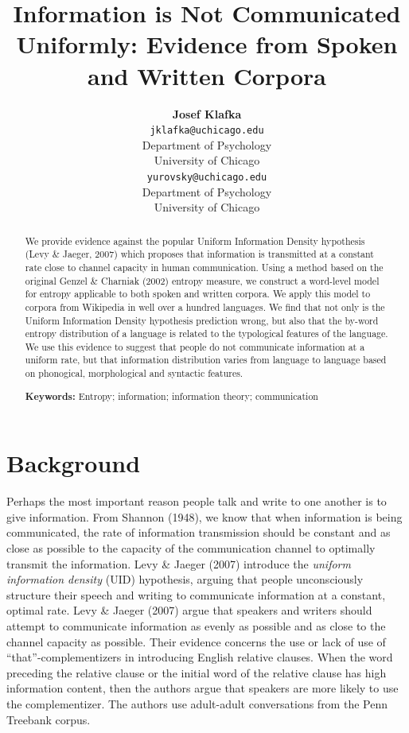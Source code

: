 \documentclass[10pt, letterpaper]{article}
\title{Information is Not Communicated Uniformly: Evidence from Spoken and
Written Corpora}
\author{{\large \bf Josef Klafka} \\ \texttt{jklafka@uchicago.edu} \\ Department of Psychology \\ University of Chicago \And {\large \bf Daniel Yurovsky} \\ \texttt{yurovsky@uchicago.edu} \\ Department of Psychology \\ University of Chicago}
\begin{document}
\maketitle

\begin{abstract}
We provide evidence against the popular Uniform Information Density
hypothesis (Levy \& Jaeger, 2007) which proposes that information is
transmitted at a constant rate close to channel capacity in human
communication. Using a method based on the original Genzel \& Charniak
(2002) entropy measure, we construct a word-level model for entropy
applicable to both spoken and written corpora. We apply this model to
corpora from Wikipedia in well over a hundred languages. We find that
not only is the Uniform Information Density hypothesis prediction wrong,
but also that the by-word entropy distribution of a language is related
to the typological features of the language. We use this evidence to
suggest that people do not communicate information at a uniform rate,
but that information distribution varies from language to language based
on phonogical, morphological and syntactic features.

\textbf{Keywords:}
Entropy; information; information theory; communication
\end{abstract}

\section{Background}\label{background}

Perhaps the most important reason people talk and write to one another
is to give information. From Shannon (1948), we know that when
information is being communicated, the rate of information transmission
should be constant and as close as possible to the capacity of the
communication channel to optimally transmit the information. Levy \&
Jaeger (2007) introduce the \emph{uniform information density} (UID)
hypothesis, arguing that people unconsciously structure their speech and
writing to communicate information at a constant, optimal rate. Levy \&
Jaeger (2007) argue that speakers and writers should attempt to
communicate information as evenly as possible and as close to the
channel capacity as possible. Their evidence concerns the use or lack of
use of ``that''-complementizers in introducing English relative clauses.
When the word preceding the relative clause or the initial word of the
relative clause has high information content, then the authors argue
that speakers are more likely to use the complementizer. The authors use
adult-adult conversations from the Penn Treebank corpus.
\end{document}
